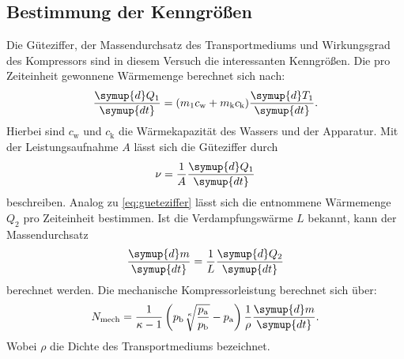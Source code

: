 \subsection{Bestimmung der Kenngrößen}
\label{sec:BdK}
Die Güteziffer, der Massendurchsatz des Transportmediums und Wirkungsgrad des Kompressors sind in diesem Versuch die
interessanten Kenngrößen.
Die pro Zeiteinheit gewonnene Wärmemenge berechnet sich nach:
\begin{equation}
	\frac{\symup{d}Q_1}{\symup{dt}}=(m_1c_{\text{w}}+m_{\text{k}}c_{\text{k}}) \frac{\symup{d}T_1}{\symup{dt}}.
	\label{eq:gueteziffer}
\end{equation}
Hierbei sind $c_{\text{w}}$ und $c_{\text{k}}$ die Wärmekapazität des Wassers und der Apparatur.
Mit der Leistungsaufnahme $A$ lässt sich die Güteziffer durch
\begin{equation}
	\nu=\frac{1}{A}\frac{\symup{d}Q_1}{\symup{dt}}
    \label{eq:leistung}
\end{equation}
beschreiben.
Analog zu \eqref{eq:gueteziffer} lässt sich die entnommene Wärmemenge $Q_2$ pro Zeiteinheit bestimmen.
Ist die Verdampfungswärme $L$ bekannt, kann der Massendurchsatz
\begin{equation}
	\frac{\symup{d}m}{\symup{dt}}=\frac{1}{L}\frac{\symup{d}Q_2}{\symup{dt}}
	\label{eq:massendurchsatz}
\end{equation}
berechnet werden.
Die mechanische Kompressorleistung berechnet sich über:
\begin{equation}
	N_{\text{mech}} = \frac{1}{\kappa - 1} \left( p_{\text{b}}
        \sqrt[{\leftroot{-1}\uproot{2}\kappa}]{
        \frac{p_{\text{a}}}{p_{\text{b}}}} -p_{\text{a}}\right)
        \frac{1}{\rho}
        \frac{\symup{d}m}{\symup{dt}}.
	\label{eq:arbeit}
\end{equation}
Wobei $\rho$ die Dichte des Transportmediums bezeichnet.
